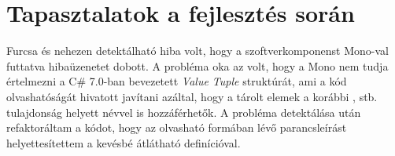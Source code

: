 \section{Tapasztalatok a fejlesztés során}

Furcsa és nehezen detektálható hiba volt, hogy a szoftverkomponenst Mono-val futtatva  hibaüzenetet dobott. A probléma oka az volt, hogy a Mono nem tudja értelmezni a C\# 7.0-ban bevezetett \textit{Value Tuple} struktúrát, ami a kód olvashatóságát hivatott javítani azáltal, hogy a tárolt elemek a korábbi ,  stb. tulajdonság helyett névvel is hozzáférhetők. A probléma detektálása után refaktoráltam a kódot, hogy az olvasható  formában lévő parancsleírást helyettesítettem a kevésbé átlátható  definícióval. 